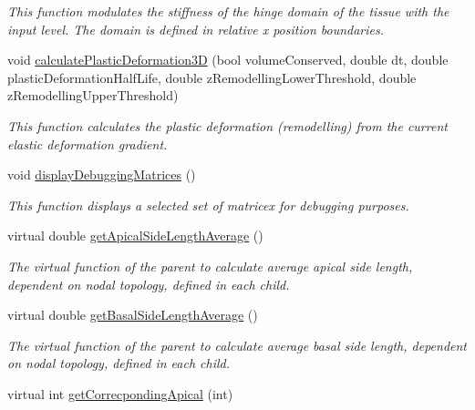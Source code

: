 \begin{DoxyCompactItemize}
\begin{DoxyCompactList}\small\item\em This function modulates the stiffness of the hinge domain of the tissue with the input level. The domain is defined in relative x position boundaries. \end{DoxyCompactList}\item 
void \hyperlink{classShapeBase_aa1c9eda4ef1eb0b23620235039bab921}{calculate\+Plastic\+Deformation3\+D} (bool volume\+Conserved, double dt, double plastic\+Deformation\+Half\+Life, double z\+Remodelling\+Lower\+Threshold, double z\+Remodelling\+Upper\+Threshold)
\begin{DoxyCompactList}\small\item\em This function calculates the plastic deformation (remodelling) from the current elastic deformation gradient. \end{DoxyCompactList}\item 
\hypertarget{classShapeBase_ac9a9f16148650a7acce1ec74aa693930}{}void \hyperlink{classShapeBase_ac9a9f16148650a7acce1ec74aa693930}{display\+Debugging\+Matrices} ()\label{classShapeBase_ac9a9f16148650a7acce1ec74aa693930}

\begin{DoxyCompactList}\small\item\em This function displays a selected set of matricex for debugging purposes. \end{DoxyCompactList}\item 
\hypertarget{classShapeBase_a6d8088a8bb897d79a796a253c06d954f}{}virtual double \hyperlink{classShapeBase_a6d8088a8bb897d79a796a253c06d954f}{get\+Apical\+Side\+Length\+Average} ()\label{classShapeBase_a6d8088a8bb897d79a796a253c06d954f}

\begin{DoxyCompactList}\small\item\em The virtual function of the parent to calculate average apical side length, dependent on nodal topology, defined in each child. \end{DoxyCompactList}\item 
\hypertarget{classShapeBase_a050c5dc5cd30c29e79533a367723b936}{}virtual double \hyperlink{classShapeBase_a050c5dc5cd30c29e79533a367723b936}{get\+Basal\+Side\+Length\+Average} ()\label{classShapeBase_a050c5dc5cd30c29e79533a367723b936}

\begin{DoxyCompactList}\small\item\em The virtual function of the parent to calculate average basal side length, dependent on nodal topology, defined in each child. \end{DoxyCompactList}\item 
\hypertarget{classShapeBase_af50dc1099b17b67a2e196724b74eab4e}{}virtual int \hyperlink{classShapeBase_af50dc1099b17b67a2e196724b74eab4e}{get\+Correcponding\+Apical} (int)\label{classShapeBase_af50dc1099b17b67a2e196724b74eab4e}


\end{DoxyCompactItemize}
